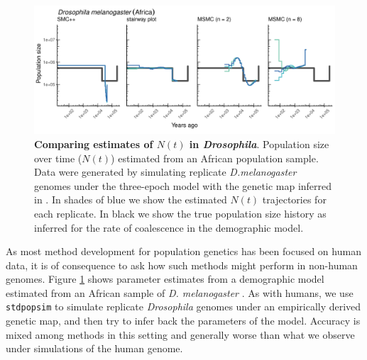 \documentclass[12pt,halfline,a4paper]{ouparticle}
\newcommand{\stdpopsim}{\texttt{stdpopsim}\xspace}
\begin{document}
\begin{figure}
\begin{center}
\includegraphics[width=0.8\linewidth]{display_items/d_mel_Sheehan_mask2.png}
\caption{\textbf{Comparing estimates of $N(t)$ in \emph{Drosophila}}. Population
size over time ($N(t)$) estimated from an African population sample. Data were generated by simulating
replicate \emph{D.melanogaster} genomes under the three-epoch \cite{sheehan2016deep} model
with the genetic map inferred in \cite{comeron2012many}. In shades of blue we show the estimated
$N(t)$ trajectories for each replicate. In black we show the true population size history as inferred
for the rate of coalescence in the demographic model.}
\label{fig:n_t_sheehan}
\end{center}
\end{figure}

As most method development for population genetics has been focused on human
data, it is of consequence to ask how such methods might perform in non-human
genomes. Figure \ref{fig:n_t_sheehan} shows parameter estimates from a demographic
model estimated from an African sample of \emph{D. melanogaster} \citep{sheehan2016deep}.
As with humans, we use \stdpopsim to simulate replicate \emph{Drosophila} genomes under
an empirically derived genetic map, and then try to infer back the parameters of the model.
Accuracy is mixed among methods in this setting and generally worse than what we
observe under simulations of the human genome.
\end{document}
